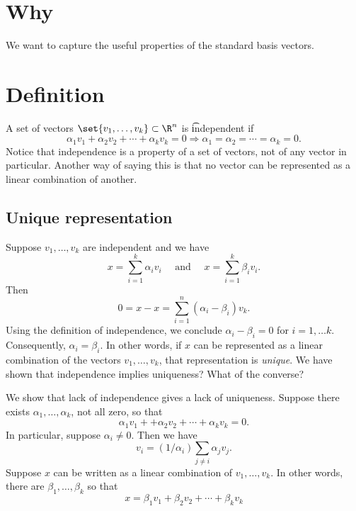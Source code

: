 
\section*{Why}

We want to capture the useful properties of the standard basis vectors.

\section*{Definition}

A set of vectors $\set{v_1, \dots , v_k} \subset \R ^n$ is \t{independent} if
\[
\alpha _1v_1 + \alpha _2v_2 + \cdots + \alpha _kv_k = 0 \Rightarrow \alpha _1 = \alpha _2 = \cdots = \alpha _k = 0.
\]
Notice that independence is a property of a set of vectors, not of any vector in particular.
Another way of saying this is that no vector can be represented as a linear combination of another.

\subsection*{Unique representation}

Suppose $v_1, \dots , v_k$ are independent and we have
\[
x = \sum_{i = 1}^{k}\alpha _i v_i \quad \text{ and } \quad x = \sum_{i = 1}^{k} \beta _i v_i.
\]
Then
\[
0 = x - x = \sum_{i = 1}^{n} (\alpha _i - \beta _i)v_k.
\]
Using the definition of independence, we conclude $\alpha _i - \beta _i = 0$ for $i = 1, \dots  k$.
Consequently, $\alpha _i = \beta _i$.
In other words, if $x$ can be represented as a linear combination of the vectors $v_1, \dots , v_k$, that representation is \textit{unique}.
We have shown that independence implies uniqueness?
What of the converse?

We show that lack of independence gives a lack of uniqueness.
Suppose there exists $\alpha _1, \dots , \alpha _k$, not all zero, so that
\[
\alpha _1v_1 + + \alpha _2 v_2 + \cdots + \alpha _kv_k = 0.
\]
In particular, suppose $\alpha _i \neq 0$.
Then we have
\[
v_i = (1/\alpha _i) \sum_{j \neq i}\alpha _j v_j.
\]
Suppose $x$ can be written as a linear combination of $v_1, \dots , v_k$.
In other words, there are $\beta _1, \dots , \beta _k$ so that
\[
x = \beta _1 v_1 + \beta _2 v_2 + \cdots + \beta _k v_k
\]

\blankpage